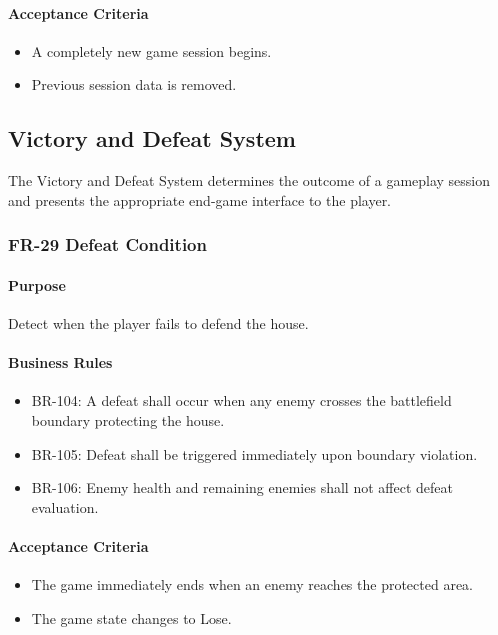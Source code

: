 \documentclass[11pt,a4paper]{article}
\begin{document}
\paragraph{Acceptance Criteria}
\begin{itemize}
  \item A completely new game session begins.
  \item Previous session data is removed.
\end{itemize}

\subsection{Victory and Defeat System}

The Victory and Defeat System determines the outcome of a gameplay session and
presents the appropriate end-game interface to the player.

\subsubsection{FR-29 Defeat Condition}

\paragraph{Purpose}
Detect when the player fails to defend the house.

\paragraph{Business Rules}
\begin{itemize}
  \item BR-104: A defeat shall occur when any enemy crosses the battlefield
        boundary protecting the house.
  \item BR-105: Defeat shall be triggered immediately upon boundary violation.
  \item BR-106: Enemy health and remaining enemies shall not affect defeat
        evaluation.
\end{itemize}

\paragraph{Acceptance Criteria}
\begin{itemize}
  \item The game immediately ends when an enemy reaches the protected area.
  \item The game state changes to Lose.
\end{itemize}
\end{document}
